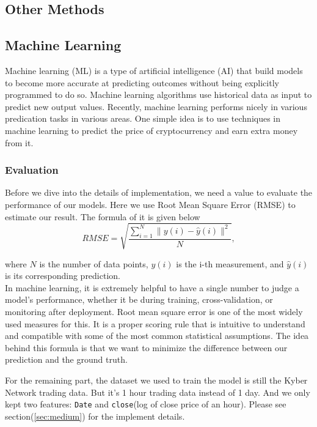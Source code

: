 \documentclass[twoside]{report}
\newcommand{\code}{\texttt}
\begin{document}
\begin{spacing}{1}
\chapter{Other Methods}
\section{Machine Learning}
Machine learning (ML) is a type of artificial intelligence (AI) that build models to become more accurate at predicting outcomes without being explicitly programmed to do so. Machine learning algorithms use historical data as input to predict new output values. Recently, machine learning performs nicely in various predication tasks in various areas. One simple idea is to use techniques in machine learning to predict the price of cryptocurrency and earn extra money from it.

\subsection{Evaluation}
Before we dive into the details of implementation, we need a value to evaluate the performance of our models. Here we use Root Mean Square Error (RMSE) to estimate our result. The formula of it is given below
\begin{equation}
R M S E=\sqrt{\frac{\sum_{i=1}^{N}\|y(i)-\hat{y}(i)\|^{2}}{N}},
\end{equation}

where $N$ is the number of data points, $y(i)$ is the i-th measurement, and $\hat{y}(i)$ is its corresponding prediction.\\

In machine learning, it is extremely helpful to have a single number to judge a model’s performance, whether it be during training, cross-validation, or monitoring after deployment. Root mean square error is one of the most widely used measures for this. It is a proper scoring rule that is intuitive to understand and compatible with some of the most common statistical assumptions. The idea behind this formula is that we want to minimize the difference between our prediction and the ground truth. 

For the remaining part, the dataset we used to train the model is still the Kyber Network trading data. But it's 1 hour trading data instead of 1 day. And we only kept two features: \code{Date} and \code{close}(log of close price of an hour). Please see section(\ref{sec:medium}) for the implement details.


\end{spacing}
\end{document}
